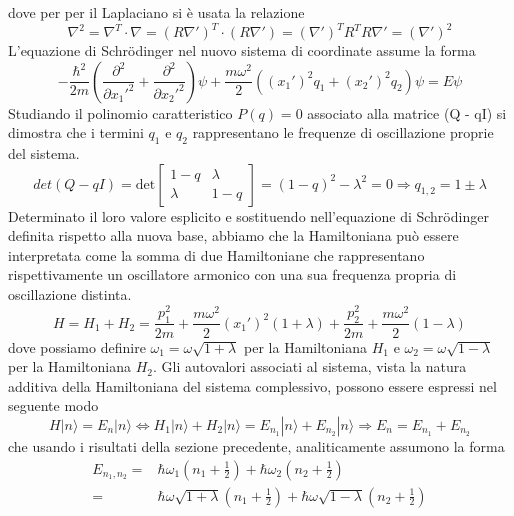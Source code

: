 dove per per il Laplaciano si \`e usata la relazione 
\begin{equation*}
	\nabla^2 = \nabla^T \cdot \nabla = (R\nabla')^T \cdot (R\nabla') = (\nabla')^TR^TR\nabla' = (\nabla')^2  
\end{equation*}
L'equazione di Schr\"odinger nel nuovo sistema di coordinate assume la forma 
\begin{equation*}
	- \frac{\hbar^2}{2m} \left ( \frac{\partial^2}{\partial x_1'^2 } + \frac{\partial^2}{\partial x_2'^2}\right) \psi  + \frac{m\omega^2}{2}\left ( (x_1')^2q_1 + (x_2')^2q_2 \right) \psi = E \psi
\end{equation*}
Studiando il polinomio caratteristico $P(q) = 0$ associato alla matrice (Q - qI) si dimostra che i termini $q_{1}$ e $q_2$ rappresentano le frequenze di oscillazione proprie del sistema.
\begin{equation*}
	det(Q-qI) = \text{det} \left [ \begin{array}{cc}
		1-q & \lambda \\
		\lambda & 1-q 
	\end{array} \right ] = (1-q)^2-\lambda^2 = 0 \Rightarrow q_{1,2} = 1 \pm \lambda
\end{equation*}
Determinato il loro valore esplicito e sostituendo nell'equazione di Schr\"odinger definita rispetto alla nuova base, abbiamo che la Hamiltoniana pu\`o essere interpretata come la somma di due Hamiltoniane che rappresentano rispettivamente un oscillatore armonico con una sua frequenza propria di oscillazione distinta.
\begin{equation*}
	H = H_1 + H_2 = \frac{p_1^2}{2m} + \frac{m\omega^2}{2}(x_1')^2(1+\lambda) + \frac{p_2^2}{2m} + \frac{m \omega^2}{2}(1-\lambda)
\end{equation*}
dove possiamo definire $\omega_1 = \omega \sqrt{1+\lambda}$ per la Hamiltoniana $H_1$ e $\omega_2 = \omega \sqrt{1 -\lambda }$ per la Hamiltoniana $H_2$. Gli autovalori associati al sistema, vista la natura additiva della Hamiltoniana del sistema complessivo, possono essere espressi nel seguente modo 
\begin{equation*}
	H |n \rangle = E_{n}|n \rangle \iff H_1|n\rangle + H_2|n\rangle = E_{n_1}|n \rangle + E_{n_2}|n \rangle  \Rightarrow E_n = E_{n_1} + E_{n_2}  
\end{equation*}
che usando i risultati della sezione precedente, analiticamente assumono la forma
\begin{align*}
	E_{n_1,n_2} = & \hbar \omega_1 \left (n_1 + \frac{1}{2} \right ) + \hbar \omega_2 \left (n_2 + \frac{1}{2} \right ) \\[0.5cm] = 
	& \hbar \omega \sqrt{1+\lambda} \left (n_1 + \frac{1}{2} \right ) + \hbar \omega \sqrt{1-\lambda}\left (n_2 + \frac{1}{2} \right )
\end{align*}

